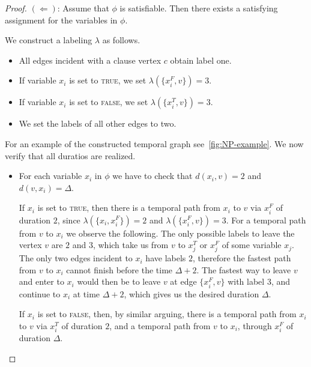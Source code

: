 \documentclass[a4paper,UKenglish,cleveref, autoref, thm-restate, anonymous]{lipics-v2021}
\begin{document}
\begin{proof}

$(\Leftarrow)$: Assume that $\phi$ is satisfiable. Then there exists a satisfying assignment for the variables in $\phi$.

We construct a labeling $\lambda$ as follows.
\begin{itemize}
    \item All edges incident with a clause vertex $c$ obtain label one.
    \item If variable $x_i$ is set to \textsc{true}, we set $\lambda(\{x_i^F, v\})=3$.
    \item If variable $x_i$ is set to \textsc{false}, we set $\lambda(\{x_i^T, v\})=3$.
    \item We set the labels of all other edges to two.
\end{itemize}
For an example of the constructed temporal graph see~\cref{fig:NP-example}.
We now verify that all duratios are realized.
\begin{itemize}
    \item For each variable $x_i$ in $\phi$ we have to check that $d(x_i,v)=2$
    and $d(v,x_i)=\Delta$. 
    
    If $x_i$ is set to \textsc{true}, then there is a temporal path from $x_i$ to $v$ via 
    $x_i^F$ of duration $2$, since
    $\lambda(\{x_i, x_i^F\})=2$ and $\lambda(\{x_i^F, v\})=3$.
    For a temporal path from $v$ to $x_i$ we observe the following.
    The only possible labels to leave the vertex $v$ are $2$ and $3$, which take us from $v$ to $x_j^T$ or $x_j^F$ of some variable $x_j$.
    The only two edges incident to $x_i$ have labels $2$, therefore the fastest path from $v$ to $x_i$
    cannot finish before the time $\Delta + 2$.
    The fastest way to leave $v$ and enter to $x_i$ would then be to leave $v$ at edge $\{x_i^F,v\}$ with label $3$,
    and continue to $x_i$ at time $\Delta + 2$,
    which gives us the desired duration $\Delta$.
    
    If $x_i$ is set to \textsc{false}, then, by similar arguing, 
    there is a temporal path from $x_i$ to $v$ via $x_i^T$ of duration $2$,
    and a temporal path from $v$ to $x_i$, through $x_i^F$ of duration $\Delta$.


\end{itemize}
\end{proof}
\end{document}
